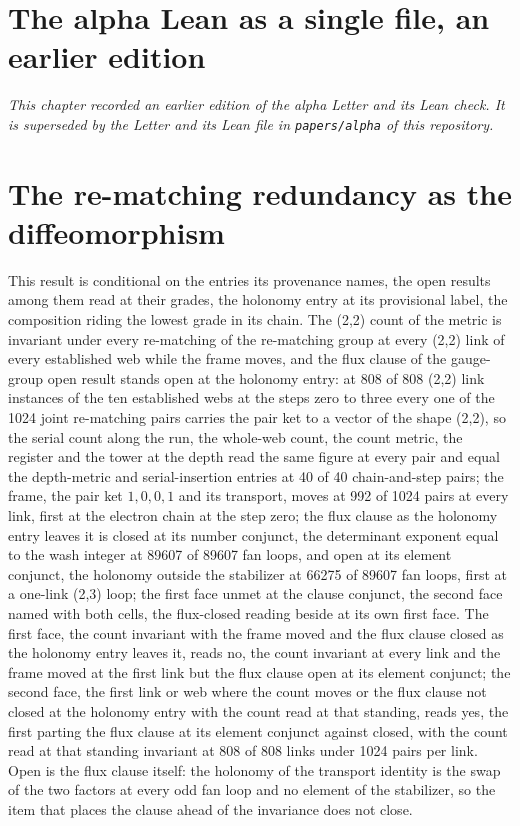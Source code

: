 \section{The alpha Lean as a single file, an earlier edition}\label{mod:V-1-D543049-the-alpha-lean-as-a-single-file}
\par\noindent\textit{This chapter recorded an earlier edition of the alpha Letter and its Lean check. It is superseded by the Letter and its Lean file in \texttt{papers/alpha} of this repository.}\par
\section{The re-matching redundancy as the diffeomorphism}\label{mod:V-1-D543680-w-rmdf}
\begin{chwall}\label{box:V-1-D543680-w-rmdf:1}
This result is conditional on the entries its provenance names, the open results among them read at their grades, the holonomy entry at its provisional label, the composition riding the lowest grade in its chain. The (2,2) count of the metric is invariant under every re-matching of the re-matching group at every (2,2) link of every established web while the frame moves, and the flux clause of the gauge-group open result stands open at the holonomy entry: at 808 of 808 (2,2) link instances of the ten established webs at the steps zero to three every one of the 1024 joint re-matching pairs carries the pair ket to a vector of the shape (2,2), so the serial count along the run, the whole-web count, the count metric, the register and the tower at the depth read the same figure at every pair and equal the depth-metric and serial-insertion entries at 40 of 40 chain-and-step pairs; the frame, the pair ket $1,0,0,1$ and its transport, moves at 992 of 1024 pairs at every link, first at the electron chain at the step zero; the flux clause as the holonomy entry leaves it is closed at its number conjunct, the determinant exponent equal to the wash integer at 89607 of 89607 fan loops, and open at its element conjunct, the holonomy outside the stabilizer at 66275 of 89607 fan loops, first at a one-link (2,3) loop; the first face unmet at the clause conjunct, the second face named with both cells, the flux-closed reading beside at its own first face.
The first face, the count invariant with the frame moved and the flux clause closed as the holonomy entry leaves it, reads no, the count invariant at every link and the frame moved at the first link but the flux clause open at its element conjunct; the second face, the first link or web where the count moves or the flux clause not closed at the holonomy entry with the count read at that standing, reads yes, the first parting the flux clause at its element conjunct against closed, with the count read at that standing invariant at 808 of 808 links under 1024 pairs per link. Open is the flux clause itself: the holonomy of the transport identity is the swap of the two factors at every odd fan loop and no element of the stabilizer, so the item that places the clause ahead of the invariance does not close.
\end{chwall}
